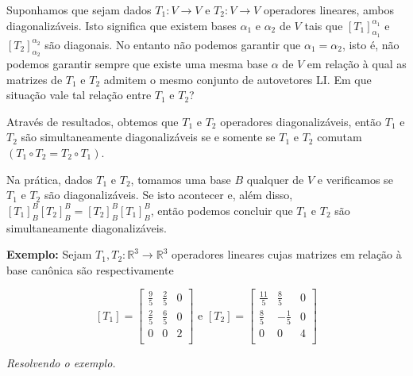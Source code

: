\documentclass[oneside,a4paper,12pt]{article}
\begin{document}
Suponhamos que sejam dados $T_1 :V \rightarrow V$ e $T_2 : V \rightarrow V$ operadores lineares, ambos diagonalizáveis. Isto significa que existem bases $\alpha_1$ e $\alpha_2$ de $V$ tais que $[T_1]_{\alpha_1}^{\alpha_1}$ e $[T_2]_{\alpha_2}^{\alpha_2}$ são diagonais. No entanto não podemos garantir que $\alpha_1 = \alpha_2$, isto é, não podemos garantir sempre que existe uma mesma base $\alpha$ de $V$ em relação à qual as matrizes de $T_1$ e $T_2$ admitem o mesmo conjunto de autovetores LI. Em que situação vale tal relação entre $T_1$ e $T_2$?

Através de resultados, obtemos que $T_1$ e $T_2$ operadores diagonalizáveis, então $T_1$ e $T_2$ são simultaneamente diagonalizáveis se e somente se $T_1$ e $T_2$ comutam $(T_1 \circ T_2 = T_2 \circ T_1)$.

Na prática, dados $T_1$ e $T_2$, tomamos uma base $B$ qualquer de $V$ e verificamos se $T_1$ e $T_2$ são diagonalizáveis. Se isto acontecer e, além disso, $[T_1]_{B}^{B}[T_2]_{B}^{B} = [T_2]_{B}^{B}[T_1]_{B}^{B}$, então podemos concluir que $T_1$ e $T_2$ são simultaneamente diagonalizáveis.

{\bf Exemplo:} Sejam $T_1 , T_2: \mathbb{R}^3 \rightarrow \mathbb{R}^3$ operadores lineares cujas matrizes em relação à base canônica são respectivamente


$$[T_1] = \left[
\begin{array}{ccc}
\frac{9}{5}	&	\frac{2}{5}	&	0\\
\frac{2}{5}	&	\frac{6}{5}	&	0 \\
0			&	0			&	2	\\
\end{array}
\right]
\text{ e }
[T_2] = \left[
\begin{array}{ccc}
\frac{11}{5}	&	\frac{8}{5}		&	0\\
\frac{8}{5}		&	-\frac{1}{5}	&	0 \\
0				&	0				&	4	\\
\end{array}
\right]
$$


\vspace{50pt}
\emph{Resolvendo o exemplo.}
\end{document}
